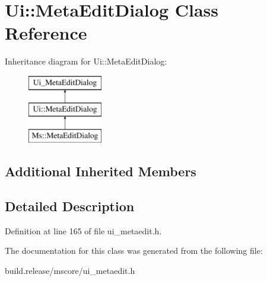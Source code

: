 \hypertarget{class_ui_1_1_meta_edit_dialog}{}\section{Ui\+:\+:Meta\+Edit\+Dialog Class Reference}
\label{class_ui_1_1_meta_edit_dialog}
Inheritance diagram for Ui\+:\+:Meta\+Edit\+Dialog\+:\begin{figure}[H]
\begin{center}
\leavevmode
\includegraphics[height=3.000000cm]{class_ui_1_1_meta_edit_dialog}
\end{center}
\end{figure}
\subsection*{Additional Inherited Members}


\subsection{Detailed Description}


Definition at line 165 of file ui\+\_\+metaedit.\+h.



The documentation for this class was generated from the following file\+:\begin{DoxyCompactItemize}
\item 
build.\+release/mscore/ui\+\_\+metaedit.\+h\end{DoxyCompactItemize}
